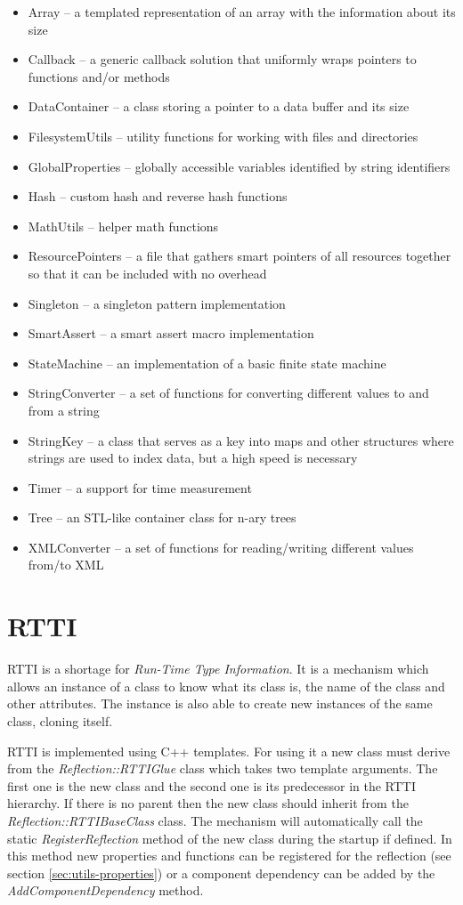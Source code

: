 \begin{itemize}
  \item Array -- a templated representation of an array with the information about its size
  \item Callback -- a generic callback solution that uniformly wraps pointers to functions and/or methods
  \item DataContainer -- a class storing a pointer to a data buffer and its size
  \item FilesystemUtils -- utility functions for working with files and directories
  \item GlobalProperties -- globally accessible variables identified by string identifiers
  \item Hash -- custom hash and reverse hash functions
  \item MathUtils -- helper math functions
  \item ResourcePointers -- a file that gathers smart pointers of all resources together so that it can be included with no overhead
  \item Singleton -- a singleton pattern implementation
  \item SmartAssert -- a smart assert macro implementation
  \item StateMachine -- an implementation of a basic finite state machine
  \item StringConverter -- a set of functions for converting different values to and from a string
  \item StringKey -- a class that serves as a key into maps and other structures where strings are used to index data, but a high speed is necessary
  \item Timer -- a support for time measurement
  \item Tree -- an STL-like container class for n-ary trees
  \item XMLConverter -- a set of functions for reading/writing different values from/to XML
\end{itemize}

\section{RTTI}
RTTI is a shortage for \emph{Run-Time Type Information}. It is a mechanism which allows an instance of a class to know what its class is, the name of the class and other attributes. The instance is also able to create new instances of the same class, cloning itself.

RTTI is implemented using C++ templates. For using it a new class must derive from the \emph{Reflection::RTTIGlue} class which takes two template arguments. The first one is the new class and the second one is its predecessor in the RTTI hierarchy. If there is no parent then the new class should inherit from the \emph{Reflection::RTTIBaseClass} class. The mechanism will automatically call the static \emph{RegisterReflection} method of the new class during the startup if defined. In this method new properties and functions can be registered for the reflection (see section \ref{sec:utils-properties}) or a component dependency can be added by the \emph{AddComponentDependency} method.

